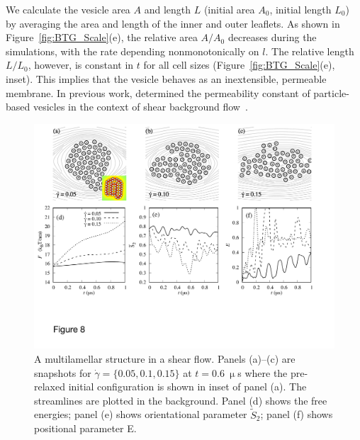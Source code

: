 \documentclass[prb,preprint,showpacs,preprintnumbers,amsmath,amssymb,longbibliography]{revtex4-1}
\begin{document}
We calculate the vesicle area $A$ and length $L$ (initial area $A_0$,
initial length $L_0$) by averaging the area and length of the inner and
outer leaflets. As shown in Figure~\ref{fig:BTG_Scale}(e), the relative
area $A/A_0$ decreases during the simulations, with the rate depending
nonmonotonically on $l$. The relative length $L/L_0$, however, is
constant in $t$ for all cell sizes (Figure~\ref{fig:BTG_Scale}(e),
inset). This implies that the vesicle behaves as an inextensible,
permeable membrane. In previous work, \citet{Fu2022_JFM} determined the
permeability constant of particle-based vesicles in the context of shear
background flow~\cite{chabanon2017, qua-gan-you2021}.



\begin{figure}
  \begin{center}
\includegraphics[width=1.0\textwidth]{Figures/Figure8.pdf}
  \end{center}
  \vspace{-20pt}  
  \caption{\label{fig:BC2_shear} A multilamellar structure in a shear
  flow. Panels (a)--(c) are snapshots for $\dot \gamma = \{0.05, 0.1,
  0.15\}$ at $t=0.6\ \upmu$s where the pre-relaxed initial configuration
  is shown in inset of panel (a). The streamlines are plotted in the
  background. Panel (d) shows the free energies; panel (e) shows
  orientational parameter $\tilde{S}_2$; panel (f) shows positional
  parameter E.}
\end{figure}
\end{document}
